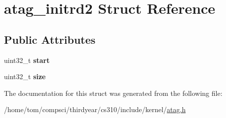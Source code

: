 \hypertarget{structatag__initrd2}{}\section{atag\+\_\+initrd2 Struct Reference}
\label{structatag__initrd2}
\subsection*{Public Attributes}
\begin{DoxyCompactItemize}
\item 
\mbox{\label{structatag__initrd2_a51dfc7388cdeacb800eba6f00280957c}} 
uint32\+\_\+t {\bfseries start}
\item 
\mbox{\label{structatag__initrd2_a267a2d733451757914aa1de7e23e9e64}} 
uint32\+\_\+t {\bfseries size}
\end{DoxyCompactItemize}


The documentation for this struct was generated from the following file\+:\begin{DoxyCompactItemize}
\item 
/home/tom/compsci/thirdyear/cs310/include/kernel/\mbox{\hyperlink{atag_8h}{atag.\+h}}\end{DoxyCompactItemize}
